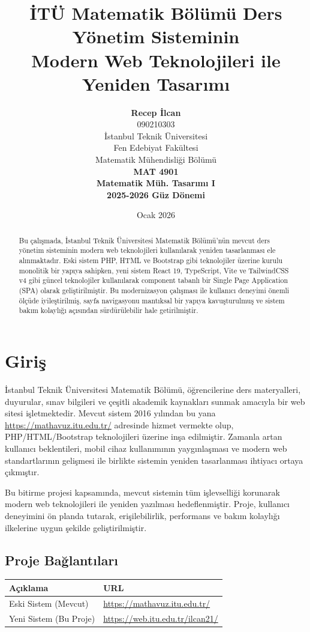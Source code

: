 \documentclass[12pt,a4paper]{article}
\title{İTÜ Matematik Bölümü Ders Yönetim Sisteminin\\Modern Web Teknolojileri ile Yeniden Tasarımı}
\author{
    \textbf{Recep İlcan}\\[0.5em]
    090210303\\[1.5em]
    İstanbul Teknik Üniversitesi\\
    Fen Edebiyat Fakültesi\\
    Matematik Mühendisliği Bölümü\\[1.5em]
    \textbf{MAT 4901}\\
    \textbf{Matematik Müh. Tasarımı I}\\
    \textbf{2025-2026 Güz Dönemi}
}
\date{Ocak 2026}
\begin{document}
\maketitle

\begin{abstract}
Bu çalışmada, İstanbul Teknik Üniversitesi Matematik Bölümü'nün mevcut ders yönetim sisteminin modern web teknolojileri kullanılarak yeniden tasarlanması ele alınmaktadır. Eski sistem PHP, HTML ve Bootstrap gibi teknolojiler üzerine kurulu monolitik bir yapıya sahipken, yeni sistem React 19, TypeScript, Vite ve TailwindCSS v4 gibi güncel teknolojiler kullanılarak component tabanlı bir Single Page Application (SPA) olarak geliştirilmiştir. Bu modernizasyon çalışması ile kullanıcı deneyimi önemli ölçüde iyileştirilmiş, sayfa navigasyonu mantıksal bir yapıya kavuşturulmuş ve sistem bakım kolaylığı açısından sürdürülebilir hale getirilmiştir.
\end{abstract}

\newpage
\tableofcontents
\newpage

\section{Giriş}

İstanbul Teknik Üniversitesi Matematik Bölümü, öğrencilerine ders materyalleri, duyurular, sınav bilgileri ve çeşitli akademik kaynakları sunmak amacıyla bir web sitesi işletmektedir. Mevcut sistem 2016 yılından bu yana \url{https://mathavuz.itu.edu.tr/} adresinde hizmet vermekte olup, PHP/HTML/Bootstrap teknolojileri üzerine inşa edilmiştir. Zamanla artan kullanıcı beklentileri, mobil cihaz kullanımının yaygınlaşması ve modern web standartlarının gelişmesi ile birlikte sistemin yeniden tasarlanması ihtiyacı ortaya çıkmıştır.

Bu bitirme projesi kapsamında, mevcut sistemin tüm işlevselliği korunarak modern web teknolojileri ile yeniden yazılması hedeflenmiştir. Proje, kullanıcı deneyimini ön planda tutarak, erişilebilirlik, performans ve bakım kolaylığı ilkelerine uygun şekilde geliştirilmiştir.

\subsection{Proje Bağlantıları}

\begin{table}[H]
\centering
\begin{tabular}{@{}ll@{}}
\toprule
\textbf{Açıklama} & \textbf{URL} \\
\midrule
Eski Sistem (Mevcut) & \url{https://mathavuz.itu.edu.tr/} \\
Yeni Sistem (Bu Proje) & \url{https://web.itu.edu.tr/ilcan21/} \\
\bottomrule
\end{tabular}
\end{table}
\end{document}
